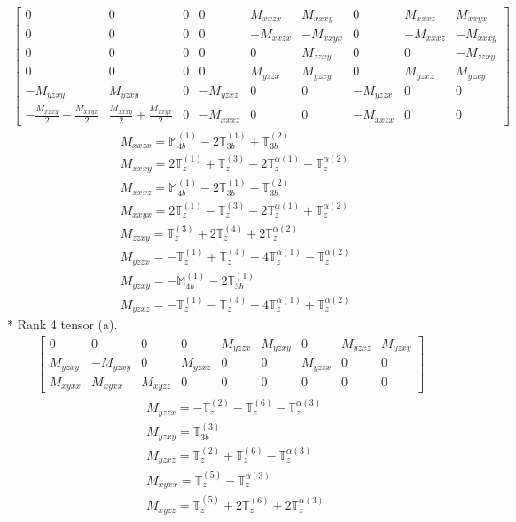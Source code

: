 \documentclass[fleqn,8pt,landscape]{jsarticle}
\begin{document}
\begin{align*}
\begin{bmatrix} 0 & 0 & 0 & 0 & M_{xxzx} & M_{xxxy} & 0 & M_{xxxz} & M_{xxyx} \\ 0 & 0 & 0 & 0 & - M_{xxzx} & - M_{xxyx} & 0 & - M_{xxxz} & - M_{xxxy} \\ 0 & 0 & 0 & 0 & 0 & M_{zzxy} & 0 & 0 & - M_{zzxy} \\ 0 & 0 & 0 & 0 & M_{yzzx} & M_{yzxy} & 0 & M_{yzxz} & M_{yzxy} \\ - M_{yzxy} & M_{yzxy} & 0 & - M_{yzxz} & 0 & 0 & - M_{yzzx} & 0 & 0 \\ - \frac{M_{xxxy}}{2} - \frac{M_{xxyx}}{2} & \frac{M_{xxxy}}{2} + \frac{M_{xxyx}}{2} & 0 & - M_{xxxz} & 0 & 0 & - M_{xxzx} & 0 & 0 \end{bmatrix}
\end{align*}
\begin{align*}
& M_{xxzx} = \mathbb{M}_{4b}^{(1)} - 2 \mathbb{T}_{3b}^{(1)} + \mathbb{T}_{3b}^{(2)} \\
& M_{xxxy} = 2 \mathbb{T}_{z}^{(1)} + \mathbb{T}_{z}^{(3)} - 2 \mathbb{T}_{z}^{\alpha(1)} - \mathbb{T}_{z}^{\alpha(2)} \\
& M_{xxxz} = \mathbb{M}_{4b}^{(1)} - 2 \mathbb{T}_{3b}^{(1)} - \mathbb{T}_{3b}^{(2)} \\
& M_{xxyx} = 2 \mathbb{T}_{z}^{(1)} - \mathbb{T}_{z}^{(3)} - 2 \mathbb{T}_{z}^{\alpha(1)} + \mathbb{T}_{z}^{\alpha(2)} \\
& M_{zzxy} = \mathbb{T}_{z}^{(3)} + 2 \mathbb{T}_{z}^{(4)} + 2 \mathbb{T}_{z}^{\alpha(2)} \\
& M_{yzzx} = - \mathbb{T}_{z}^{(1)} + \mathbb{T}_{z}^{(4)} - 4 \mathbb{T}_{z}^{\alpha(1)} - \mathbb{T}_{z}^{\alpha(2)} \\
& M_{yzxy} = - \mathbb{M}_{4b}^{(1)} - 2 \mathbb{T}_{3b}^{(1)} \\
& M_{yzxz} = - \mathbb{T}_{z}^{(1)} - \mathbb{T}_{z}^{(4)} - 4 \mathbb{T}_{z}^{\alpha(1)} + \mathbb{T}_{z}^{\alpha(2)}
\end{align*}
* Rank 4 tensor (a).
\begin{align*}
\begin{bmatrix} 0 & 0 & 0 & 0 & M_{yzzx} & M_{yzxy} & 0 & M_{yzxz} & M_{yzxy} \\ M_{yzxy} & - M_{yzxy} & 0 & M_{yzxz} & 0 & 0 & M_{yzzx} & 0 & 0 \\ M_{xyxx} & M_{xyxx} & M_{xyzz} & 0 & 0 & 0 & 0 & 0 & 0 \end{bmatrix}
\end{align*}
\begin{align*}
& M_{yzzx} = - \mathbb{T}_{z}^{(2)} + \mathbb{T}_{z}^{(6)} - \mathbb{T}_{z}^{\alpha(3)} \\
& M_{yzxy} = \mathbb{T}_{3b}^{(3)} \\
& M_{yzxz} = \mathbb{T}_{z}^{(2)} + \mathbb{T}_{z}^{(6)} - \mathbb{T}_{z}^{\alpha(3)} \\
& M_{xyxx} = \mathbb{T}_{z}^{(5)} - \mathbb{T}_{z}^{\alpha(3)} \\
& M_{xyzz} = \mathbb{T}_{z}^{(5)} + 2 \mathbb{T}_{z}^{(6)} + 2 \mathbb{T}_{z}^{\alpha(3)}
\end{align*}
\end{document}
